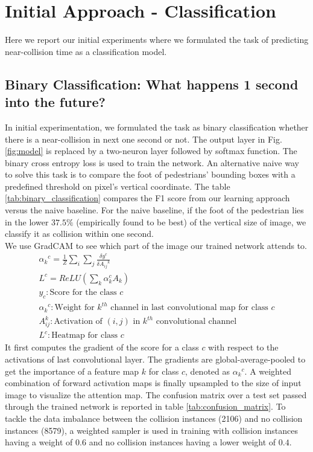 \section{Initial Approach - Classification}
Here we report our initial experiments where we formulated the task of predicting near-collision time as a classification model. 

\subsection{Binary Classification: What happens 1 second into the future?}

In initial experimentation, we formulated the task as binary classification whether there is a near-collision in next one second or not. The output layer in Fig. \ref{fig:model} is replaced by a two-neuron layer followed by softmax function. The binary cross entropy loss is used to train the network. An alternative naive way to solve this task is to compare the foot of pedestrians' bounding boxes with a predefined threshold on pixel's vertical coordinate. The table \ref{tab:binary_classification} compares the F1 score from our learning approach versus the naive baseline. For the naive baseline, if the foot of the pedestrian lies in the lower $37.5\%$ (empirically found to be best) of the vertical size of image, we classify it as collision within one second.  \\

We use GradCAM \cite{gradCAM} to see which part of the image our trained network attends to. 
\begin{align*}
    {\alpha_k}^{c} = \frac{1}{Z}\sum_{i}\sum_{j}\frac{\delta y^{c}}{\delta {A_{ij}}^{k}} \\
    L^{c} = ReLU(\sum_{k} \alpha_{k}^{c}A_{k})\\
    y_c: \text{Score for the class $c$}\\
    {\alpha_k}^{c}: \text{Weight for $k^{th}$ channel in last convolutional map for class $c$}\\
    A_{ij}^{k}: \text{Activation of $(i, j)$ in $k^{th}$ convolutional channel}\\
    L^{c}: \text{Heatmap for class $c$}
\end{align*}
It first computes the gradient of the score for a class $c$ with respect to the activations of last convolutional layer. The gradients are global-average-pooled to get the importance of a feature map $k$ for class $c$, denoted as ${\alpha_k}^{c}$. A weighted combination of forward activation maps is finally upsampled to the  size of input image to visualize the attention map. The confusion matrix over a test set passed through the trained network is reported in table \ref{tab:confusion_matrix}. To tackle the data imbalance between the collision instances (2106) and no collision instances (8579), a weighted sampler is used in training with collision instances having a weight of $0.6$ and no collision instances having a lower weight of $0.4$.

